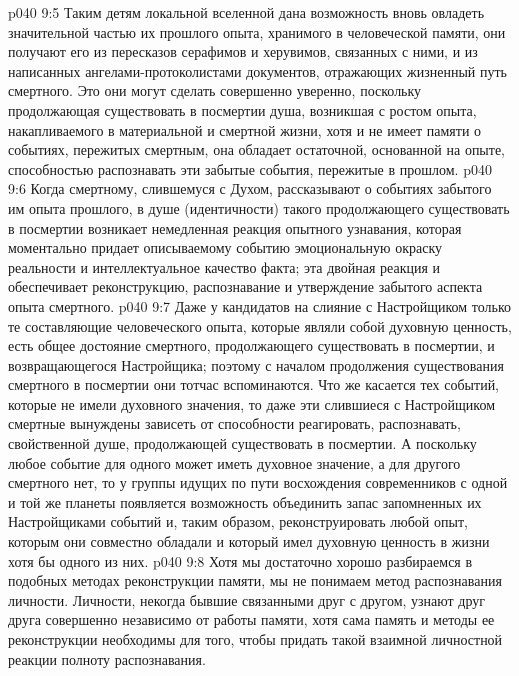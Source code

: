 \vs p040 9:5 Таким детям локальной вселенной дана возможность вновь овладеть значительной частью их прошлого опыта, хранимого в человеческой памяти, они получают его из пересказов серафимов и херувимов, связанных с ними, и из написанных ангелами\hyp{}протоколистами документов, отражающих жизненный путь смертного. Это они могут сделать совершенно уверенно, поскольку продолжающая существовать в посмертии душа, возникшая с ростом опыта, накапливаемого в материальной и смертной жизни, хотя и не имеет памяти о событиях, пережитых смертным, она обладает остаточной, основанной на опыте, способностью распознавать эти забытые события, пережитые в прошлом.
\vs p040 9:6 Когда смертному, слившемуся с Духом, рассказывают о событиях забытого им опыта прошлого, в душе (идентичности) такого продолжающего существовать в посмертии возникает немедленная реакция опытного узнавания, которая моментально придает описываемому событию эмоциональную окраску реальности и интеллектуальное качество факта; эта двойная реакция и обеспечивает реконструкцию, распознавание и утверждение забытого аспекта опыта смертного.
\vs p040 9:7 Даже у кандидатов на слияние с Настройщиком только те составляющие человеческого опыта, которые являли собой духовную ценность, есть общее достояние смертного, продолжающего существовать в посмертии, и возвращающегося Настройщика; поэтому с началом продолжения существования смертного в посмертии они тотчас вспоминаются. Что же касается тех событий, которые не имели духовного значения, то даже эти слившиеся с Настройщиком смертные вынуждены зависеть от способности реагировать, распознавать, свойственной душе, продолжающей существовать в посмертии. А поскольку любое событие для одного может иметь духовное значение, а для другого смертного нет, то у группы идущих по пути восхождения современников с одной и той же планеты появляется возможность объединить запас запомненных их Настройщиками событий и, таким образом, реконструировать любой опыт, которым они совместно обладали и который имел духовную ценность в жизни хотя бы одного из них.
\vs p040 9:8 \pc Хотя мы достаточно хорошо разбираемся в подобных методах реконструкции памяти, мы не понимаем метод распознавания личности. Личности, некогда бывшие связанными друг с другом, узнают друг друга совершенно независимо от работы памяти, хотя сама память и методы ее реконструкции необходимы для того, чтобы придать такой взаимной личностной реакции полноту распознавания.
